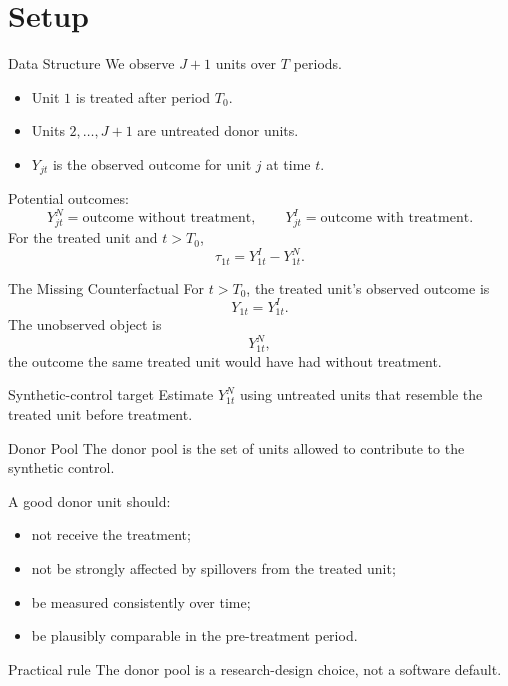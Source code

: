 \documentclass[11pt,aspectratio=169]{beamer}
\newcommand{\derivbutton}[1]{\vspace{0.4em}\hfill\hyperlink{app:#1}{\beamerbutton{Appendix details}}}
\begin{document}
\section{Setup}

\begin{frame}{Data Structure}
  \hypertarget{main:setup}{}
  We observe \(J+1\) units over \(T\) periods.
  \begin{itemize}
    \item Unit \(1\) is treated after period \(T_0\).
    \item Units \(2,\ldots,J+1\) are untreated donor units.
    \item \(Y_{jt}\) is the observed outcome for unit \(j\) at time \(t\).
  \end{itemize}
  Potential outcomes:
  \[
    Y^N_{jt} = \text{outcome without treatment}, \qquad
    Y^I_{jt} = \text{outcome with treatment}.
  \]
  For the treated unit and \(t>T_0\),
  \[
    \tau_{1t}=Y^I_{1t}-Y^N_{1t}.
  \]
  \derivbutton{potential-outcomes}
\end{frame}

\begin{frame}{The Missing Counterfactual}
  For \(t>T_0\), the treated unit's observed outcome is
  \[
    Y_{1t}=Y^I_{1t}.
  \]
  The unobserved object is
  \[
    Y^N_{1t},
  \]
  the outcome the same treated unit would have had without treatment.
  \begin{block}{Synthetic-control target}
    Estimate \(Y^N_{1t}\) using untreated units that resemble the treated unit before treatment.
  \end{block}
\end{frame}

\begin{frame}{Donor Pool}
  The donor pool is the set of units allowed to contribute to the synthetic control.
  \vspace{0.3em}

  A good donor unit should:
  \begin{itemize}
    \item not receive the treatment;
    \item not be strongly affected by spillovers from the treated unit;
    \item be measured consistently over time;
    \item be plausibly comparable in the pre-treatment period.
  \end{itemize}
  \begin{block}{Practical rule}
    The donor pool is a research-design choice, not a software default.
  \end{block}
\end{frame}
\end{document}
